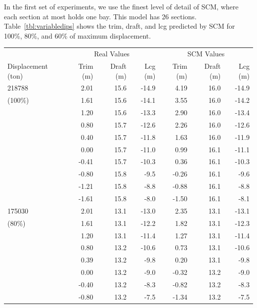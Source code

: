 \documentclass[runningheads]{llncs}
\begin{document}
In the first set of experiments, we use the finest level of detail of SCM, where each section at most holds one bay. This model has 26 sections. Table~\ref{tbl:variabledips} shows the trim, draft, and lcg predicted by SCM for 
100\%, 80\%, and 60\% of maximum displacement.
\begin{table}[h!]
\begin{tabular}{l|@{\:\:}rrr@{\:\:}|@{\:\:}rrr}              
&\multicolumn{3}{c}{Real Values} & \multicolumn{3}{c}{SCM Values}\\
Displacement (ton) &  Trim (m)  &   Draft (m)  &   Lcg (m) &   Trim (m)  &  Draft (m) &   Lcg (m)\\
\hline \rule{0pt}{3ex}
218788      &2.01      &15.6    &-14.9   &4.19    &16.0&-14.9  \\
(100\%)                &1.61    &15.6    &-14.1   &3.55    &16.0&-14.2  \\
                &1.20    &15.6    &-13.3   &2.90    &16.0&-13.4  \\
                &0.80    &15.7    &-12.6   &2.26    &16.0&-12.6  \\
                &0.40    &15.7    &-11.8   &1.63    &16.0&-11.9  \\
                &0.00    &15.7    &-11.0   &0.99    &16.1&-11.1  \\
                &-0.41   &15.7    &-10.3   &0.36    &16.1&-10.3  \\
                &-0.80   &15.8    &-9.5     &-0.26   &16.1&-9.6   \\
                &-1.21   &15.8    &-8.8     &-0.88   &16.1&-8.8   \\
                &-1.61   &15.8    &-8.0     &-1.50   &16.1&-8.1   \\
\hline \rule{0pt}{3ex}
175030      &2.01      &13.1    &-13.0   &2.35    &13.1&-13.1  \\
(80\%)  &1.61    &13.1    &-12.2   &1.82    &13.1&-12.3  \\
                &1.20    &13.1    &-11.4   &1.27    &13.1&-11.4  \\
                &0.80    &13.2    &-10.6   &0.73    &13.1&-10.6  \\
                &0.39    &13.2    &-9.8     &0.20    &13.1&-9.8   \\
                &0.00    &13.2    &-9.0     &-0.32   &13.2&-9.0   \\
                &-0.40   &13.2    &-8.3     &-0.82   &13.2&-8.3   \\
                &-0.80   &13.2    &-7.5     &-1.34   &13.2&-7.5   \\

\end{tabular}
\end{table}
\end{document}
